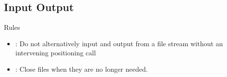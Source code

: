 \subsection{Input Output}

\begin{frame}[t]{Rules}
\begin{itemize}
  \item {}: 
        Do not alternatively input and output from a file stream
        without an intervening positioning call
  \vfill
  \item {}: 
        Close files when they are no longer needed.
\end{itemize}
\end{frame}
